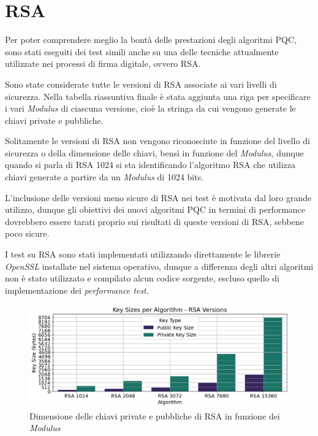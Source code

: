 \section{RSA}

Per poter comprendere meglio la bontà delle prestazioni degli algoritmi PQC, sono stati eseguiti dei test simili anche su una delle tecniche attualmente utilizzate nei processi di firma digitale, ovvero RSA.

Sono state considerate tutte le versioni di RSA associate ai vari livelli di sicurezza. Nella tabella riassuntiva finale è stata aggiunta una riga per specificare i vari \textit{Modulus} di ciascuna versione, cioè la stringa da cui vengono generate le chiavi private e pubbliche. 

Solitamente le versioni di RSA non vengono riconosciute in funzione del livello di sicurezza o della dimensione delle chiavi, bensì in funzione del \textit{Modulus}, dunque quando si parla di RSA 1024 si sta identificando l'algoritmo RSA che utilizza chiavi generate a partire da un \textit{Modulus} di 1024 bits.

L'inclusione delle versioni meno sicure di RSA nei test è motivata dal loro grande utilizzo, dunque gli obiettivi dei nuovi algoritmi PQC in termini di performance dovrebbero essere tarati proprio sui risultati di queste versioni di RSA, sebbene poco sicure.

I test su RSA sono stati implementati utilizzando direttamente le librerie \textit{OpenSSL} installate nel sistema operativo, dunque a differenza degli altri algoritmi non è stato utilizzato e compilato alcun codice sorgente, escluso quello di implementazione dei \textit{performance test}.

\begin{figure}[H]
    \centering
    \includegraphics[width=1\textwidth]{Immagini/20240822_i9/Key_Sizes/KC_rsa.png}
    \caption{Dimensione delle chiavi private e pubbliche di RSA in funzione dei \textit{Modulus}}
    \label{fig:KC_rsa}
\end{figure}

